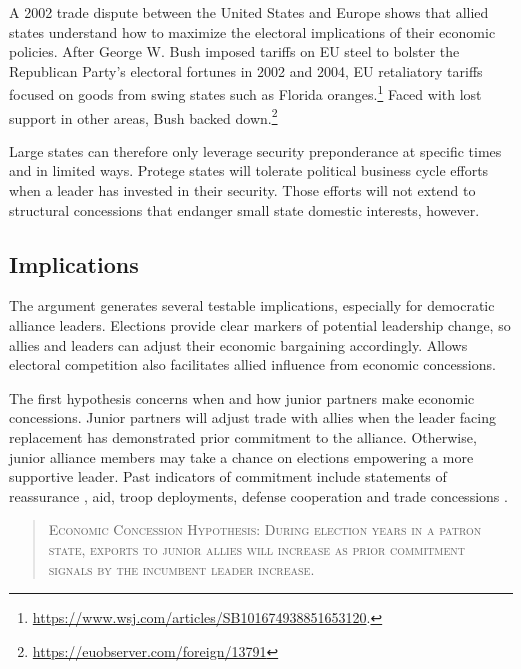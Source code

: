 \documentclass[12pt]{article}
\begin{document}
A 2002 trade dispute between the United States and Europe shows that allied states understand how to maximize the electoral implications of their economic policies. 
After George W. Bush imposed tariffs on EU steel to bolster the Republican Party's electoral fortunes in 2002 and 2004, EU retaliatory tariffs focused on goods from swing states such as Florida oranges.\footnote{\url{https://www.wsj.com/articles/SB101674938851653120}.}
Faced with lost support in other areas, Bush backed down.\footnote{\url{https://euobserver.com/foreign/13791}}


Large states can therefore only leverage security preponderance at specific times and in limited ways.
Protege states will tolerate political business cycle efforts when a leader has invested in their security. 
Those efforts will not extend to structural concessions that endanger small state domestic interests, however.



\subsection{Implications}



The argument generates several testable implications, especially for democratic alliance leaders.
Elections provide clear markers of potential leadership change, so allies and leaders can adjust their economic bargaining accordingly. 
Allows electoral competition also facilitates allied influence from economic concessions. 


The first hypothesis concerns when and how junior partners make economic concessions. 
Junior partners will adjust trade with allies when the leader facing replacement has demonstrated prior commitment to the alliance. 
Otherwise, junior alliance members may take a chance on elections empowering a more supportive leader. 
Past indicators of commitment include statements of reassurance \citep{Blankenship2020}, aid, troop deployments, defense cooperation \citep{Morrow1994, Alley2021isq} and trade concessions \citep{WolfordKim2017}.


\begin{quote}
\textsc{Economic Concession Hypothesis: During election years in a patron state, exports to junior allies will increase as prior commitment signals by the incumbent leader increase.}
\end{quote}
\end{document}
